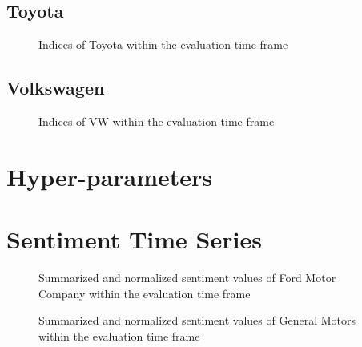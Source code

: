 \subsection{Toyota}
\label{ss:analysis-datasets-toyota}

\begin{figure}[hbt]
    \centering
        
    \caption{Indices of Toyota within the evaluation time frame}
    \label{fig:analysis-indices-toyota}
\end{figure}   

\subsection{Volkswagen}
\label{ss:analysis-datasets-vw}

\begin{figure}[hbt]
    \centering
        
    \caption{Indices of VW within the evaluation time frame}
    \label{fig:analysis-indices-vw}
\end{figure}   

\section{Hyper-parameters}
\label{s:analysis-pipelines}

\section{Sentiment Time Series}
\label{s:analysis-sentiments}

\begin{figure}[hbt]
    \centering
        
    \caption{Summarized and normalized sentiment values of Ford Motor Company within the evaluation time frame}
    \label{fig:analysis-results-ford}
\end{figure} 

\begin{figure}[hbt]
    \centering
        
    \caption{Summarized and normalized sentiment values of General Motors within the evaluation time frame}
    \label{fig:analysis-results-gm}
\end{figure} 

